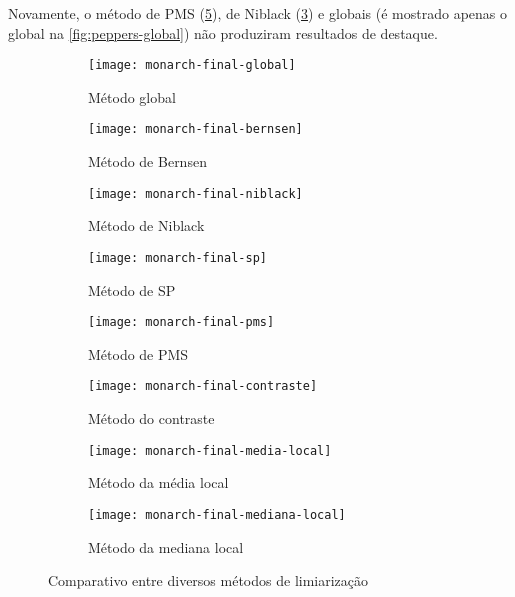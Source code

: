 \documentclass[brazilian,a4paper,twocolumn]{article}
\begin{document}
        Novamente, o método de PMS (\cref{fig:monarch-pms}), de Niblack (\cref{fig:monarch-niblack}) e globais (é mostrado apenas o global na \cref{fig:peppers-global}) não produziram resultados de destaque.

        \begin{figure}[H]
            \centering
            \begin{subfigure}{0.23\textwidth}
                \texttt{[image: monarch-final-global]}
                \caption{Método global}
                \label{fig:monarch-global}
            \end{subfigure}
            \begin{subfigure}{0.23\textwidth}
                \texttt{[image: monarch-final-bernsen]}
                \caption{Método de Bernsen}
                \label{fig:monarch-bernsen}
            \end{subfigure}
            \begin{subfigure}{0.23\textwidth}
                \texttt{[image: monarch-final-niblack]}
                \caption{Método de Niblack}
                \label{fig:monarch-niblack}
            \end{subfigure}
            \begin{subfigure}{0.23\textwidth}
                \texttt{[image: monarch-final-sp]}
                \caption{Método de SP}
                \label{fig:monarch-sp}
            \end{subfigure}
            \begin{subfigure}{0.23\textwidth}
                \texttt{[image: monarch-final-pms]}
                \caption{Método de PMS}
                \label{fig:monarch-pms}
            \end{subfigure}
            \begin{subfigure}{0.23\textwidth}
                \texttt{[image: monarch-final-contraste]}
                \caption{Método do contraste}
                \label{fig:monarch-contraste}
            \end{subfigure}
            \begin{subfigure}{0.23\textwidth}
                \texttt{[image: monarch-final-media-local]}
                \caption{Método da média local}
                \label{fig:monarch-media}
            \end{subfigure}
            \begin{subfigure}{0.23\textwidth}
                \texttt{[image: monarch-final-mediana-local]}
                \caption{Método da mediana local}
                \label{fig:monarch-mediana}
            \end{subfigure}

            \caption{Comparativo entre diversos métodos de limiarização}
            \label{fig:monarch-limiarizacao}
        \end{figure}
\end{document}
